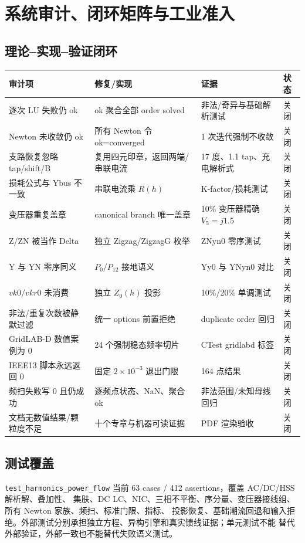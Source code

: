 \section{系统审计、闭环矩阵与工业准入}
\subsection{理论--实现--验证闭环}
\begin{center}\scriptsize
\begin{longtable}{@{}L{3.2cm}L{5.1cm}L{4.0cm}L{2.0cm}@{}}\toprule
审计项 & 修复/实现 & 证据 & 状态\\ \midrule\endhead
逐次 LU 失败仍 ok & ok 聚合全部 order solved & 非法/奇异与基础解析测试 & 关闭\\
Newton 未收敛仍 ok & 所有 Newton 令 ok=converged & 1 次迭代强制不收敛 & 关闭\\
支路恢复忽略 tap/shift/B & 复用四元印章，返回两端/串联电流 & 17 度、1.1 tap、充电解析式 & 关闭\\
损耗公式与 Ybus 不一致 & 串联电流乘 $R(h)$ & K-factor/损耗测试 & 关闭\\
变压器重复盖章 & canonical branch 唯一盖章 & 10\% 变压器精确 $V_5=j1.5$ & 关闭\\
Z/ZN 被当作 Delta & 独立 Zigzag/ZigzagG 枚举 & ZNyn0 零序测试 & 关闭\\
Y 与 YN 零序同义 & $P_0/P_{12}$ 接地语义 & Yy0 与 YNyn0 对比 & 关闭\\
$vk0/vkr0$ 未消费 & 独立 $Z_0(h)$ 投影 & 10\%/20\% 单调测试 & 关闭\\
非法/重复次数被静默过滤 & 统一 options 前置拒绝 & duplicate order 回归 & 关闭\\
GridLAB-D 数值案例为 0 & 24 个强制稳态频率切片 & CTest gridlabd 标签 & 关闭\\
IEEE13 脚本永远返回 0 & 固定 $2\times10^{-3}$ 退出门限 & 164 点结果 & 关闭\\
频扫失败写 0 且仍成功 & 逐频点状态、NaN、聚合 ok & 非法范围/未知母线回归 & 关闭\\
文档无数值结果/颗粒度不足 & 十个专章与机器可读证据 & PDF 渲染验收 & 关闭\\
\bottomrule\end{longtable}
\end{center}

\subsection{测试覆盖}
\texttt{test\_harmonics\_power\_flow} 当前 63 cases / 412 assertions，覆盖 AC/DC/HSS 解析解、叠加性、
集肤、DC LC、NIC、三相不平衡、序分量、变压器接线组、所有 Newton 家族、频扫、标准门限、指标、
投影恢复、基础潮流回退和输入拒绝。外部测试分别承担独立方程、异构引擎和真实馈线证据；单元测试不能
替代外部验证，外部一致也不能替代失败语义测试。

